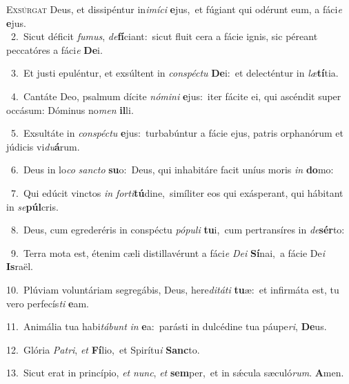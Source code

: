 \lettrine{\initial\textcolor{\initialcolor}{E}}{xsúrgat} Deus, et dissipéntur in\-\textit{i}\-\textit{mí}\textit{ci} \textbf{e}\-jus,~\star et fúgiant qui odérunt eum, a fáci\textit{e} \textbf{e}\-jus.\\
{\numbfont\textcolor{\numbcolor}{~2.}}~Sicut déficit \textit{fu}\-\textit{mus}, \textit{de}\-\textbf{fí}ciant:~\star sicut fluit cera a fácie ignis, sic péreant peccatóres a fáci\textit{e} \textbf{De}\-i.\par
{\numbfont\textcolor{\numbcolor}{~3.}}~Et justi epuléntur, et exsúltent in \textit{con}\-\textit{spéc}\textit{tu} \textbf{De}\-i:~\star et delecténtur in \textit{læ}\-\textbf{tí}tia.\par
{\numbfont\textcolor{\numbcolor}{~4.}}~Cantáte Deo, psalmum dícite \textit{nó}\-\textit{mi}\textit{ni} \textbf{e}\-jus:~\star iter fácite ei, qui ascéndit super occásum: Dóminus no\textit{men} \textbf{il}\-li.\par
{\numbfont\textcolor{\numbcolor}{~5.}}~Exsultáte in \textit{con}\-\textit{spéc}\textit{tu} \textbf{e}\-jus:~\star turbabúntur a fácie ejus, patris orphanórum et júdicis vi\-\textit{du}\-\textbf{á}rum.\par
{\numbfont\textcolor{\numbcolor}{~6.}}~Deus in lo\textit{co} \textit{sanc}\-\textit{to} \textbf{su}\-o:~\star Deus, qui inhabitáre facit uníus moris \textit{in} \textbf{do}\-mo:\par
{\numbfont\textcolor{\numbcolor}{~7.}}~Qui edúcit vinctos \textit{in} \textit{for}\-\textit{ti}\textbf{tú}dine,~\star simíliter eos qui exásperant, qui hábitant in \textit{se}\-\textbf{púl}cris.\par
{\numbfont\textcolor{\numbcolor}{~8.}}~Deus, cum egrederéris in conspéctu \textit{pó}\-\textit{pu}\textit{li} \textbf{tu}\-i,~\star cum pertransíres in \textit{de}\-\textbf{sér}to:\par
{\numbfont\textcolor{\numbcolor}{~9.}}~Terra mota est, étenim cæli distillavérunt a fáci\textit{e} \textit{De}\-\textit{i} \textbf{Sí}\-nai,~\star a fácie De\textit{i} \textbf{Is}\-raël.\par
{\numbfont\textcolor{\numbcolor}{10.}}~Plúviam voluntáriam segregábis, Deus, here\-\textit{di}\-\textit{tá}\textit{ti} \textbf{tu}\-æ:~\star et infirmáta est, tu vero perfecís\textit{ti} \textbf{e}\-am.\par
{\numbfont\textcolor{\numbcolor}{11.}}~Animália tua habi\-\textit{tá}\-\textit{bunt} \textit{in} \textbf{e}\-a:~\star parásti in dulcédine tua páupe\-\textit{ri}\-, \textbf{De}\-us.\par
{\numbfont\textcolor{\numbcolor}{12.}}~Glória \textit{Pa}\-\textit{tri}, \textit{et} \textbf{Fí}\-lio,~\star et Spirítu\textit{i} \textbf{Sanc}\-to.\par
{\numbfont\textcolor{\numbcolor}{13.}}~Sicut erat in princípio, \textit{et} \textit{nunc}\-, \textit{et} \textbf{sem}\-per,~\star et in sǽcula sæculó\-\textit{rum}\-. \textbf{A}\-men.\par
